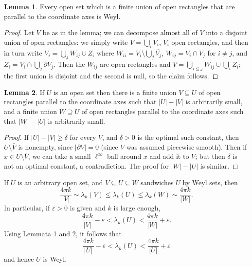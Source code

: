 \documentclass[10pt]{article}
\theoremstyle{definition}
\newtheorem{lemma}{Lemma}[exer]
\begin{document}
\begin{lemma}
\label{unions are weyl}
Every open set which is a finite union of open rectangles that are parallel to the coordinate axes is Weyl.
\end{lemma}
\begin{proof}
Let $V$ be as in the lemma; we can decompose almost all of $V$ into a disjoint union of open rectangles: we simply write $V = \bigcup_i V_i$, $V_i$ open rectangles, and then in turn write $V_i = \bigcup_j W_{ij} \cup Z_i$ where $W_{ii} = V_i \setminus \bigcup_j \overline{V_j}$, $W_{ij} = V_i \cap V_j$ for $i \neq j$, and $Z_i = V_i \cap \bigcup_j \partial V_j$.
Then the $W_{ij}$ are open rectangles and $V = \bigcup_{i \leq j} W_{ij} \cup \bigcup_i Z_i$; the first union is disjoint and the second is null, so the claim follows.
\end{proof}

\begin{lemma}
\label{sandwich}
If $U$ is an open set then there is a finite union $V \subseteq U$ of open rectangles parallel to the coordinate axes such that $|U| - |V|$ is arbitrarily small, and a finite union $W \supseteq U$ of open rectangles parallel to the coordinate axes such that $|W| - |U|$ is arbitrarily small.
\end{lemma}
\begin{proof}
If $|U| - |V| \geq \delta$ for every $V$, and $\delta > 0$ is the optimal such constant, then $U \setminus \overline V$ is nonempty, since $|\partial V| = 0$ (since $V$ was assumed piecewise smooth).
Then if $x \in U \setminus \overline V$, we can take a small $\ell^\infty$ ball around $x$ and add it to $V$; but then $\delta$ is not an optimal constant, a contradiction.
The proof for $|W|-|U|$ is similar.
\end{proof}

If $U$ is an arbitrary open set, and $V \subseteq U \subseteq W$ sandwiches $U$ by Weyl sets, then
$$\frac{4\pi k}{|V|} \sim \lambda_k(V) \leq \lambda_k(U) \leq \lambda_k(W) \sim \frac{4\pi k}{|W|}.$$
In particular, if $\varepsilon > 0$ is given and $k$ is large enough,
$$\frac{4\pi k}{|V|} - \varepsilon < \lambda_k(U) < \frac{4\pi k}{|W|} + \varepsilon.$$
Using Lemmata \ref{unions are weyl} and \ref{sandwich}, it follows that
$$\frac{4\pi k}{|U|} - \varepsilon < \lambda_k(U) < \frac{4\pi k}{|U|} + \varepsilon$$
and hence $U$ is Weyl.
\end{document}

